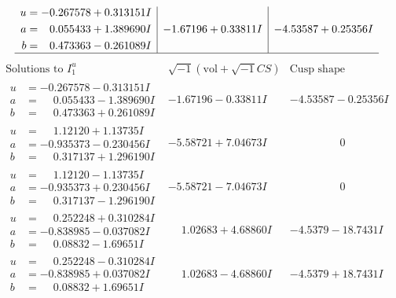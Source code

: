 \documentclass[1p]{elsarticle_modified}
\theoremstyle{definition}
\newcommand{\I}{\sqrt{-1}}
\begin{document}
$$\begin{array}{c|c|c}
\begin{aligned}
u &= -0.267578 + 0.313151 I \\
a &= \phantom{-}0.055433 + 1.389690 I \\
b &= \phantom{-}0.473363 - 0.261089 I\end{aligned}
 & -1.67196 + 0.33811 I & -4.53587 + 0.25356 I\\
 \hline 
 \end{array}$$\newpage$$\begin{array}{c|c|c}  
\text{Solutions to }I^u_{1}& \I (\text{vol} + \sqrt{-1}CS) & \text{Cusp shape}\\
 \hline 
\begin{aligned}
u &= -0.267578 - 0.313151 I \\
a &= \phantom{-}0.055433 - 1.389690 I \\
b &= \phantom{-}0.473363 + 0.261089 I\end{aligned}
 & -1.67196 - 0.33811 I & -4.53587 - 0.25356 I \\ \hline\begin{aligned}
u &= \phantom{-}1.12120 + 1.13735 I \\
a &= -0.935373 - 0.230456 I \\
b &= \phantom{-}0.317137 + 1.296190 I\end{aligned}
 & -5.58721 + 7.04673 I & \phantom{-0.000000 } 0 \\ \hline\begin{aligned}
u &= \phantom{-}1.12120 - 1.13735 I \\
a &= -0.935373 + 0.230456 I \\
b &= \phantom{-}0.317137 - 1.296190 I\end{aligned}
 & -5.58721 - 7.04673 I & \phantom{-0.000000 } 0 \\ \hline\begin{aligned}
u &= \phantom{-}0.252248 + 0.310284 I \\
a &= -0.838985 - 0.037082 I \\
b &= \phantom{-}0.08832 - 1.69651 I\end{aligned}
 & \phantom{-}1.02683 + 4.68860 I & -4.5379 - 18.7431 I \\ \hline\begin{aligned}
u &= \phantom{-}0.252248 - 0.310284 I \\
a &= -0.838985 + 0.037082 I \\
b &= \phantom{-}0.08832 + 1.69651 I\end{aligned}
 & \phantom{-}1.02683 - 4.68860 I & -4.5379 + 18.7431 I \\ \hline\begin{aligned}

\end{aligned}
\end{array}$$
\end{document}

